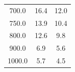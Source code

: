 \begin{table}
\begin{center}
\begin{tabular}{|c|c|c|}
     700.0 &                16.4 &                12.0 \\
     750.0 &                13.9 &                10.4 \\
     800.0 &                12.6 &                 9.8 \\
     900.0 &                 6.9 &                 5.6 \\
    1000.0 &                 5.7 &                 4.5 \\
\hline
\end{tabular}
\end{center}
\end{table}
















